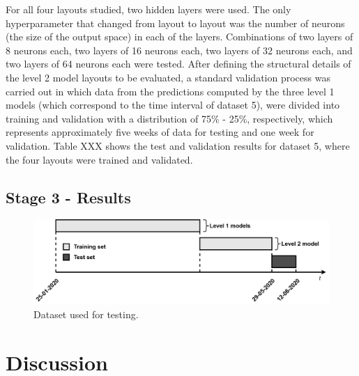 For all four layouts studied, two hidden layers were used. The only hyperparameter that changed from layout to layout was the number of neurons (the size of the output space) in each of the layers. Combinations of two layers of 8 neurons each, two layers of 16 neurons each, two layers of 32 neurons each, and two layers of 64 neurons each were tested. After defining the structural details of the level 2 model layouts to be evaluated, a standard validation process was carried out in which data from the predictions computed by the three level 1 models (which correspond to the time interval of dataset 5), were divided into training and validation with a distribution of 75\% - 25\%, respectively, which represents approximately five weeks of data for testing and one week for validation. Table XXX shows the test and validation results for dataset 5, where the four layouts were trained and validated.









\subsection{Stage 3 - Results}

\begin{figure}[h!]
    \centering
    \begin{center}
    \includegraphics[width=1\textwidth]{Images/Test.png}
    \caption{Dataset used for testing.}
    \label{test}
    \end{center}
\end{figure}

\section{Discussion}


